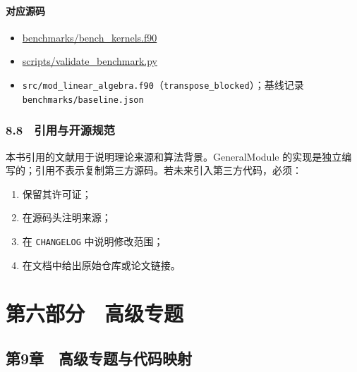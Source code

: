 \documentclass[
]{ctexbook}
\providecommand{\tightlist}{%
  \setlength{\itemsep}{0pt}\setlength{\parskip}{0pt}}
\let\origsection\section
\renewcommand{\section}[1]{%
  \needspace{9\baselineskip}%
  \origsection{#1}%
}
\let\origsubsection\subsection
\renewcommand{\subsection}[1]{%
  \needspace{6\baselineskip}%
  \origsubsection{#1}%
}
\begin{document}
\hypertarget{ux5bf9ux5e94ux6e90ux7801-38}{%
\paragraph{对应源码}\label{ux5bf9ux5e94ux6e90ux7801-38}}

\begin{itemize}
\tightlist
\item
  \href{https://github.com/l1Ha/QuantumGeneralModule/blob/main/benchmarks/bench_kernels.f90}{benchmarks/bench\_kernels.f90}
\item
  \href{https://github.com/l1Ha/QuantumGeneralModule/blob/main/scripts/validate_benchmark.py}{scripts/validate\_benchmark.py}
\item
  \texttt{src/mod\_linear\_algebra.f90}（\texttt{transpose\_blocked}）；基线记录
  \texttt{benchmarks/baseline.json}
\end{itemize}

\hypertarget{ux5f15ux7528ux4e0eux5f00ux6e90ux89c4ux8303}{%
\subsubsection{8.8　引用与开源规范}\label{ux5f15ux7528ux4e0eux5f00ux6e90ux89c4ux8303}}

本书引用的文献用于说明理论来源和算法背景。GeneralModule
的实现是独立编写的；引用不表示复制第三方源码。若未来引入第三方代码，必须：

\begin{enumerate}
\def\labelenumi{\arabic{enumi}.}
\tightlist
\item
  保留其许可证；
\item
  在源码头注明来源；
\item
  在 \texttt{CHANGELOG} 中说明修改范围；
\item
  在文档中给出原始仓库或论文链接。
\end{enumerate}

\hypertarget{ux7b2cux516dux90e8ux5206-ux9ad8ux7ea7ux4e13ux9898}{%
\section{第六部分　高级专题}\label{ux7b2cux516dux90e8ux5206-ux9ad8ux7ea7ux4e13ux9898}}

\hypertarget{ux7b2c9ux7ae0-ux9ad8ux7ea7ux4e13ux9898ux4e0eux4ee3ux7801ux6620ux5c04}{%
\subsection{第9章　高级专题与代码映射}\label{ux7b2c9ux7ae0-ux9ad8ux7ea7ux4e13ux9898ux4e0eux4ee3ux7801ux6620ux5c04}}
\end{document}
